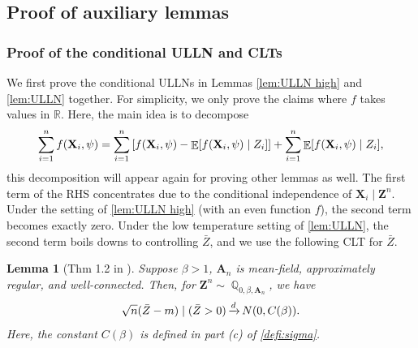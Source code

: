 \documentclass[preprint,reqno]{imsart}
\newtheorem{lemma}[thm]{Lemma}
\DeclareMathOperator{\xd}{\xrightarrow{\mathnormal d}}
\DeclareMathOperator{\EE}{\mathbb{E}}
\DeclareMathOperator{\QQ}{\mathbb{Q}}
\newcommand{\A}{\mathbf{A}}
\newcommand{\Z}{\mathbf{Z}}
\newcommand{\X}{\mathbf{X}}
\DeclareMathOperator{\sumin}{\sum_{\mathnormal i=1}^{\mathnormal n}}
\begin{document}
\begin{appendix}
\subsection{Proof of auxiliary lemmas}\label{sec:proof of lemmas}
\subsubsection{Proof of the conditional ULLN and CLTs}\label{subsec:ulln clt proof}

We first prove the conditional ULLNs in Lemmas \ref{lem:ULLN high} and \ref{lem:ULLN} together. For simplicity, we only prove the claims where $f$ takes values in $\mathbb{R}$. Here, the main idea is to decompose $$\sumin f(\X_i, \psi) = \sumin \left[f(\X_i, \psi) - \EE[f(\X_i, \psi) \mid Z_i]\right] + \sumin \EE[f(\X_i, \psi) \mid Z_i],$$ this decomposition will appear again for proving other lemmas as well. The first term of the RHS concentrates due to the conditional independence of $\X_i \mid \Z^n$. Under the setting of \cref{lem:ULLN high} (with an even function $f$), the second term becomes exactly zero. Under the low temperature setting of \cref{lem:ULLN}, the second term boils downs to controlling $\bar{Z}$, and we use the following CLT for $\bar{Z}$.
%

    \begin{lemma}[Thm 1.2 in \citep{deb2023fluctuations}]\label{lem:Ising CLT}
        Suppose $\beta > 1$, $\A_n$ is mean-field, approximately regular, and well-connected. Then, for $\Z^n \sim \QQ_{0,\beta,\A_n}$, we have
        $$\sqrt{n}(\bar{Z} - m) \mid (\bar{Z} > 0) \xd N(0, C(\beta)).$$
        Here, the constant $C(\beta)$ is defined in part (c) of \cref{defi:sigma}.
    \end{lemma}




\end{appendix}
\end{document}
